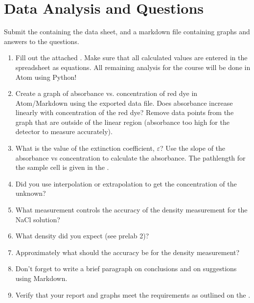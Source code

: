 \documentclass[letterpaper,10pt,english]{sphinxmanual}
\begin{document}
\section{Data Analysis and Questions}
\label{\detokenize{Laboratory_Measurements/Laboratory_Measurements:data-analysis-and-questions}}\label{\detokenize{Laboratory_Measurements/Laboratory_Measurements:heading-laboratory-measurements-and-procedures-data-analysis-and-questions}}
Submit the  containing the data sheet, and a markdown file containing graphs and answers to the questions.
\begin{enumerate}
\item {} 
Fill out the attached . Make sure that all calculated values are entered in the spreadsheet as equations. All remaining analysis for the course will be done in Atom using Python!

\item {} 
Create a graph of absorbance vs. concentration of red dye  in Atom/Markdown using the exported data file. Does absorbance increase linearly with concentration of the red dye? Remove data points from the graph that are outside of the linear region (absorbance too high for the detector to measure accurately).

\item {} 
What is the value of the extinction coefficient, \(\varepsilon\)? Use the slope of the absorbance vs concentration to calculate the absorbance. The pathlength for the sample cell is given in the  {\hyperref[\detokenize{ProCoDA/ProCoDA:heading-procoda-photometer}]{}}.

\item {} 
Did you use interpolation or extrapolation to get the concentration of the unknown?

\item {} 
What measurement controls the accuracy of the density measurement for the NaCl solution?

\item {} 
What density did you expect (see prelab 2)?

\item {} 
Approximately what should the accuracy be for the density measurement?

\item {} 
Don’t forget to write a brief paragraph on conclusions and on suggestions using Markdown.

\item {} 
Verify that your report and graphs meet the requirements as outlined on the .

\end{enumerate}
\end{document}
